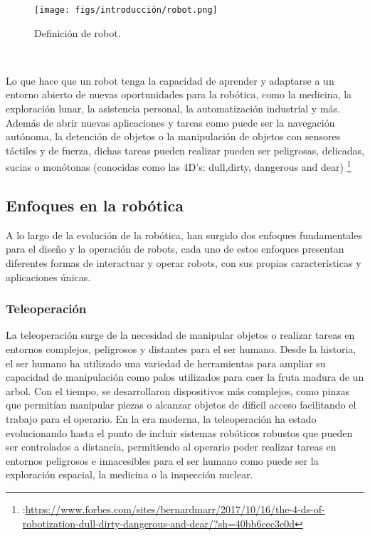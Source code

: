 \begin{figure} [H]
  \begin{center}
    \texttt{[image: figs/introducción/robot.png]}
  \end{center}
  \caption{Definición de robot.}
  \label{fig:robot}
\end{figure}\

Lo que hace que un robot tenga la capacidad de aprender y adaptarse a un entorno abierto de nuevas oportunidades para la robótica, como la medicina, la exploración
lunar, la asistencia personal, la automatización industrial y más. Además de abrir nuevas aplicaciones y tareas como puede ser la navegación autónoma, la detención de objetos o 
la manipulación de objetos con sensores táctiles y de fuerza, dichas tareas pueden realizar pueden ser peligrosas, delicadas, sucias o monótonas 
(conocidas como las 4D's: dull,dirty, dangerous and dear) \footnote{:\url{https://www.forbes.com/sites/bernardmarr/2017/10/16/the-4-ds-of-robotization-dull-dirty-dangerous-and-dear/?sh=40bb6cec3e0d}}

 \subsection{Enfoques en la robótica}
 \label{sec:enfoquesrobotica}
A lo largo de la evolución de la robótica, han surgido dos enfoques fundamentales para el diseño y la operación de robots, cada uno de estos enfoques presentan diferentes
formas de interactuar y operar robots, con sus propias características y aplicaciones únicas. 

\subsubsection{Teleoperación}
\label{sec:subseccion}

La teleoperación surge de la necesidad de manipular objetos o realizar tareas en entornos complejos, peligrosos y distantes para el ser humano. Desde la historia, el ser humano
ha utilizado una variedad de herramientas para ampliar su capacidad de manipulación como palos utilizados para caer la fruta madura de un arbol. Con el tiempo, se desarrollaron 
dispositivos más complejos, como pinzas que permitían manipular piezas o alcanzar objetos de díficil acceso facilitando el trabajo para el operario. En la era moderna, la teleoperación
ha estado evolucionando hasta el punto de incluir sistemas robóticos robustos que pueden ser controlados a distancia, permitiendo al operario poder realizar
tareas en entornos peligrosos e innacesibles para el ser humano como puede ser la exploración espacial, la medicina o la inspección nuclear. \newline

